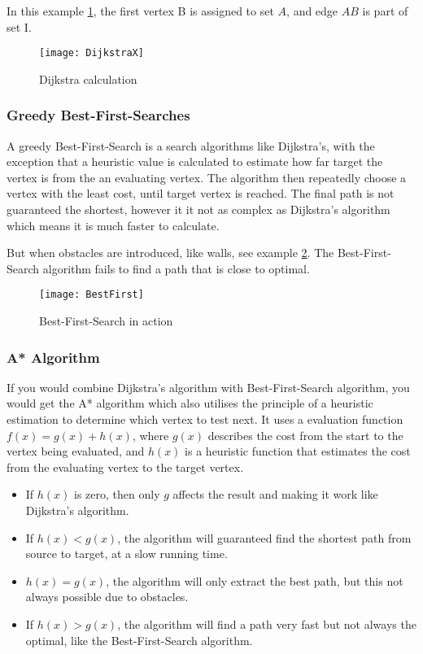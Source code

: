   In this example \cref{fig:dijkstra_calc}, the first vertex B is assigned to set $A$, and edge $AB$ is part of set \RN{1}.

  \begin{figure}[ht!]
    \centering
    \texttt{[image: DijkstraX]}
    \caption{Dijkstra calculation}
    \label{fig:dijkstra_calc}
  \end{figure}

  \subsubsection{Greedy Best-First-Searches}

  A greedy Best-First-Search is a search algorithms like Dijkstra's, with the exception that a heuristic value is calculated to estimate how far target the vertex is from the an evaluating vertex. The algorithm then repeatedly choose a vertex with the least cost, until target vertex is reached. The final path is not guaranteed the shortest, however it it not as complex as Dijkstra's algorithm which means it is much faster to calculate. \cite{Bailey}

  But when obstacles are introduced, like walls, see example \cref{bestfirst}. The Best-First-Search algorithm fails to find a path that is close to optimal.

  \begin{figure}[ht!]
    \centering
    \texttt{[image: BestFirst]} 
    \caption{Best-First-Search in action}
    \label{bestfirst}
  \end{figure}

  \subsubsection{A* Algorithm}

  If you would combine Dijkstra's algorithm with Best-First-Search algorithm, you would get the A* algorithm which also utilises the principle of a heuristic estimation to determine which vertex to test next. It uses a evaluation function $f(x) = g(x) + h(x)$, where $g(x)$ describes the cost from the start to the vertex being evaluated, and $h(x)$ is a heuristic function that estimates the cost from the evaluating vertex to the target vertex. \cite{Patel2013}

  \begin{itemize}
    \item If $h(x)$ is zero, then only $g$ affects the result and making it work like Dijkstra's algorithm.

    \item If $h(x) < g(x)$, the algorithm will guaranteed find the shortest path from source to target, at a slow running time.

    \item $h(x) = g(x)$, the algorithm will only extract the best path, but this not always possible due to obstacles.

    \item If $h(x) > g(x)$, the algorithm will find a path very fast but not always the optimal, like the Best-First-Search algorithm.
  \end{itemize}


